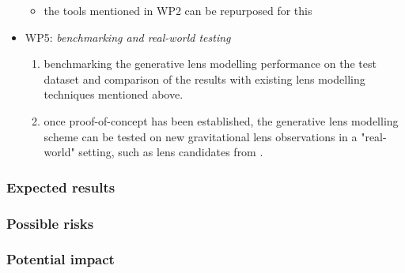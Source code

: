 \documentclass[a4paper,10pt]{article}
\begin{document}
\begin{itemize}[leftmargin=*]
\begin{itemize}[leftmargin=*]
\item the tools mentioned in WP2 can be repurposed for this
\end{itemize}
\item WP5: \emph{benchmarking and real-world testing}
\begin{enumerate}[leftmargin=*]
\item benchmarking the generative lens modelling performance on the
test dataset and comparison of the results with existing lens
modelling techniques mentioned above.
\item once proof-of-concept has been established, the generative lens
modelling scheme can be tested on new gravitational lens
observations in a "real-world" setting, such as lens candidates
from \cite{Huang21,Storfer22}.
\end{enumerate}
\end{itemize}

\subsubsection{Expected results}
\label{sec:org49e537f}


\subsubsection{Possible risks}
\label{sec:org4af72d2}

\subsubsection{Potential impact}
\label{sec:org55917c4}





\end{document}
